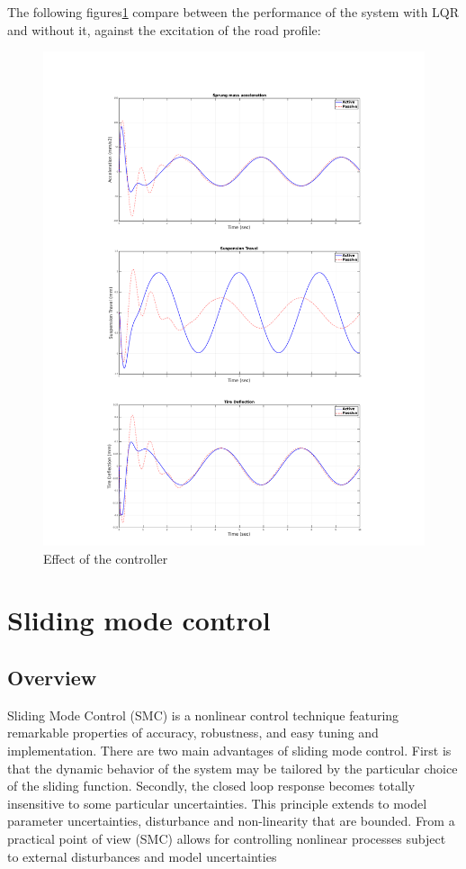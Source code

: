 \newpage
The following figures\ref{fig:all-road} compare between the performance of the system with LQR and without it, against the excitation of the road profile:
\begin{figure}[H]
	\centering
	\includegraphics[trim=0cm 1cm 0cm 2cm, clip, width=1\linewidth]{figures/p-a-road.pdf}
	\caption{Effect of the controller}
	\label{fig:all-road}
\end{figure}

\newpage
\section{Sliding mode control}
\subsection{Overview}
Sliding Mode Control (SMC) is a nonlinear control technique featuring
remarkable properties of accuracy, robustness, and easy tuning and implementation. There are
two main advantages of sliding mode control. First is that the dynamic behavior of the system may
be tailored by the particular choice of the sliding function. Secondly, the closed loop response
becomes totally insensitive to some particular uncertainties. This principle extends to model
parameter uncertainties, disturbance and non-linearity that are bounded. From a practical point
of view (SMC) allows for controlling nonlinear processes subject to external disturbances and
model uncertainties
